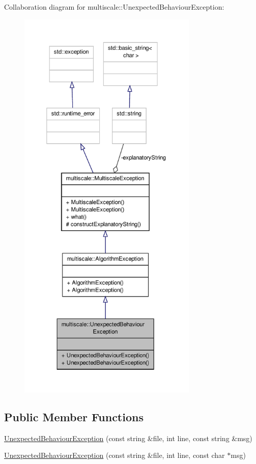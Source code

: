 Collaboration diagram for multiscale\-:\-:Unexpected\-Behaviour\-Exception\-:\nopagebreak
\begin{figure}[H]
\begin{center}
\leavevmode
\includegraphics[height=550pt]{classmultiscale_1_1UnexpectedBehaviourException__coll__graph}
\end{center}
\end{figure}
\subsection*{Public Member Functions}
\begin{DoxyCompactItemize}
\item 
\hyperlink{classmultiscale_1_1UnexpectedBehaviourException_a99903f4c6c5f1746cb15f0ccf2c1233b}{Unexpected\-Behaviour\-Exception} (const string \&file, int line, const string \&msg)
\item 
\hyperlink{classmultiscale_1_1UnexpectedBehaviourException_adc0d1294e28ffd3eed251a60832d43bc}{Unexpected\-Behaviour\-Exception} (const string \&file, int line, const char $\ast$msg)
\end{DoxyCompactItemize}
